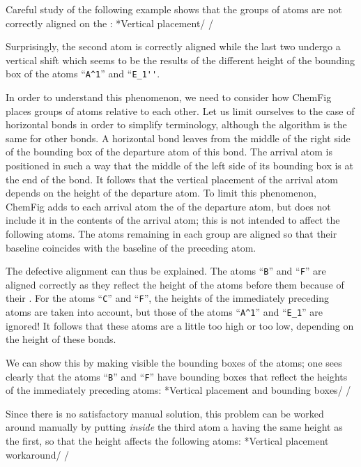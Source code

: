 \documentclass[10pt]{article}
\makeatletter
\newcommand\idx{\@ifstar{\let\print@or@not\@gobble\idx@}{\let\print@or@not\@firstofone\idx@}}
\newcommand\idx@[1]{%
	\ifcat\expandafter\noexpand\@car#1\@nil\relax%
		\expandafter\ifx\@car#1\@nil\protect
			\index{#1}%
			\print@or@not{#1}%
		\else
			\saveexpandmode\expandarg
			\StrSubstitute{\string#1}{\string @}{\@empty\protect\symbol{'100}}[\temp@]%
			\StrGobbleLeft\temp@1[\temp@]%
			\restoreexpandmode
			\expandafter\index\expandafter{\temp@ @\protect\texttt{\protect\textbackslash\temp@}}%
			\print@or@not{\texttt{\string#1}}%
		\fi
	\else
		\index{#1}%
		\print@or@not{#1}%
	\fi
}
\newcommand\make@car@active[2]{%
	\catcode`#1\active
	\begingroup
		\lccode`\~`#1\relax
		\lowercase{\endgroup\def~{#2}}%
}
\newif\if@exstar
\newcommand\exemple{%
	\begingroup
	\parskip\z@
	\@makeother\;\@makeother\!\@makeother\?\@makeother\:%
	\@ifstar{\@exstartrue\exemple@}{\@exstarfalse\exemple@}}
\newcommand\exemple@[2][65]{%
	\medbreak\noindent
	\begingroup
		\let\do\@makeother\dospecials
		\make@car@active\ { {}}%
		\make@car@active\^^M{\par\leavevmode}%
		\make@car@active\,{\leavevmode\kern\z@\string,}%
		\make@car@active\-{\leavevmode\kern\z@\string-}%
		\make@car@active\>{\leavevmode\kern\z@\string>}%
		\make@car@active\<{\leavevmode\kern\z@\string<}%
		\exemple@@{#1}{#2}%
}
\newcommand\exemple@@[3]{%
	\def\@tempa##1#3{\exemple@@@{#1}{#2}{##1}}%
	\@tempa
}
\newcommand\exemple@@@[3]{%
	\xdef\the@code{#3}%
	\endgroup
	\if@exstar
		\begingroup
			\fboxrule0.4pt
			\let\breakboxparindent\z@
			\def\bkvz@bottom{\hrule\@height\fboxrule}%
			\let\bkvz@before@breakbox\relax
			\def\bkvz@set@linewidth{\advance\linewidth\dimexpr-2\fboxrule-2\fboxsep}%
			\def\bkvz@left{\vrule\@width\fboxrule\hskip\fboxsep}%
			\def\bkvz@right{\hskip\fboxsep\vrule\@width\fboxrule}%
			\def\bkvz@top{\hbox to \hsize{%
				\vrule\@width\fboxrule\@height\fboxrule
				\leaders\bkvz@bottom\hfill
				\ECFAugie
				\fboxsep\z@
				\colorbox{black}{\kern0.25em\color{white}\footnotesize\lower0.5ex\hbox{\strut#2}\kern0.25em}%
				\leaders\bkvz@bottom\hfill
				\vrule\@width\fboxrule\@height\fboxrule}}%
			\breakbox
				\kern.5ex\relax
				\ttfamily\footnotesize\the@code\par
				\normalfont
				\kern3pt
				\hrule height0.1pt width\linewidth depth0.1pt
				\vskip5pt
				\rightskip0pt plus 1fill
				\everypar{{\color{lightgray}\rlap{\vrule height0.1pt width\linewidth depth0.1pt}}\hskip0pt plus 1fill}%
				\newlinechar`\^^M\everyeof{\noexpand}\scantokens{#3}\par
			\endbreakbox
		\endgroup
	\else
		\vskip0.5ex
		\boxput*(0,1)
			{\fboxsep\z@
			\hbox{\ECFAugie\colorbox{black}{\leavevmode\kern0.25em{\color{white}\footnotesize\strut#2}\kern0.25em}}%
			}%
			{\fboxsep5pt
			\fbox{%
				$\vcenter{\hsize\dimexpr0.#1\linewidth-\fboxsep-\fboxrule\relax
					\kern5pt\parskip0pt \ttfamily\footnotesize\the@code}%
				\vcenter{\kern5pt\hsize\dimexpr\linewidth-0.#1\linewidth-\fboxsep-\fboxrule\relax
					\everypar{{\color{lightgray}\rlap{\vrule height0.1pt width\dimexpr\linewidth-0.#1\linewidth-\fboxsep-\fboxrule depth0.1pt}}}%
					\footnotesize\newlinechar`\^^M\everyeof{\noexpand}\scantokens{#3}}$%
				}%
			}%
	\fi
	\medbreak
	\endgroup
}
\let\do\@makeother\dospecials
\newcommand\CF{{\ECFAugie ChemFig}\xspace}
\makeatother
\begin{document}
Careful study of the following example shows that the groups of atoms are not correctly aligned on the \idx{baseline}:
\exemple*{Vertical placement}/\Huge\setatomsep{2em}
\qquad
{}/

Surprisingly, the second atom is correctly aligned while the last two undergo a vertical shift which seems to be the results of the different height of the bounding box of the atoms ``\verb-A^1-'' and ``\verb-E_1''-.

In order to understand this phenomenon, we need to consider how \CF places groups of atoms relative to each other. Let us limit ourselves to the case of horizontal bonds in order to simplify terminology, although the algorithm is the same for other bonds. A horizontal bond leaves from the middle of the right side of the bounding box of the departure atom of this bond. The arrival atom is positioned in such a way that the middle of the left side of its bounding box is at the end of the bond. It follows that the vertical placement of the arrival atom depends on the height of the departure atom. To limit this phenomenon, \CF adds to each arrival atom the \idx{\vphantom} of the departure atom, but does not include it in the contents of the arrival atom; this \idx{\vphantom} is not intended to affect the following atoms. The atoms remaining in each group are aligned so that their baseline coincides with the baseline of the preceding atom.

The defective alignment can thus be explained. The atoms ``\verb-B-'' and ``\verb-F-'' are aligned correctly as they reflect the height of the atoms before them because of their \idx{\vphantom}. For the atoms ``\verb-C-'' and ``\verb-F-'', the heights of the immediately preceding atoms are taken into account, but those of the atoms ``\verb-A^1-'' and ``\verb-E_1-'' are ignored! It follows that these atoms are a little too high or too low, depending on the height of these bonds.

We can show this by making visible the bounding boxes of the atoms; one sees clearly that the atoms ``\verb-B-'' and ``\verb-F-'' have bounding boxes that reflect the heights of the immediately preceding atoms:
\exemple*{Vertical placement and bounding boxes}/\Huge\setatomsep{2em}
\fboxsep=0pt
\renewcommand\printatom[1]{\fbox{\ensuremath{\mathrm#1}}}
\qquad
{}/

Since there is no satisfactory manual solution, this problem can be worked around manually by putting \emph{inside} the third atom a \idx{\vphantom} having the same height as the first, so that the height affects the following atoms:
\exemple*{Vertical placement workaround}/\Huge\setatomsep{2em}
\qquad
{}/
\end{document}
